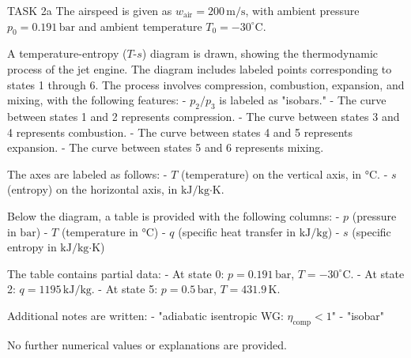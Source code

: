 TASK 2a  
The airspeed is given as \( w_{\text{air}} = 200 \, \text{m/s} \), with ambient pressure \( p_0 = 0.191 \, \text{bar} \) and ambient temperature \( T_0 = -30^\circ\text{C} \).  

A temperature-entropy (\( T \)-\( s \)) diagram is drawn, showing the thermodynamic process of the jet engine. The diagram includes labeled points corresponding to states 1 through 6. The process involves compression, combustion, expansion, and mixing, with the following features:  
- \( p_2/p_3 \) is labeled as "isobars."  
- The curve between states 1 and 2 represents compression.  
- The curve between states 3 and 4 represents combustion.  
- The curve between states 4 and 5 represents expansion.  
- The curve between states 5 and 6 represents mixing.  

The axes are labeled as follows:  
- \( T \) (temperature) on the vertical axis, in \( \text{°C} \).  
- \( s \) (entropy) on the horizontal axis, in \( \text{kJ/kg·K} \).  

Below the diagram, a table is provided with the following columns:  
- \( p \) (pressure in \( \text{bar} \))  
- \( T \) (temperature in \( \text{°C} \))  
- \( q \) (specific heat transfer in \( \text{kJ/kg} \))  
- \( s \) (specific entropy in \( \text{kJ/kg·K} \))  

The table contains partial data:  
- At state 0: \( p = 0.191 \, \text{bar} \), \( T = -30^\circ\text{C} \).  
- At state 2: \( q = 1195 \, \text{kJ/kg} \).  
- At state 5: \( p = 0.5 \, \text{bar} \), \( T = 431.9 \, \text{K} \).  

Additional notes are written:  
- "adiabatic isentropic WG: \( \eta_{\text{comp}} < 1 \)"  
- "isobar"  

No further numerical values or explanations are provided.